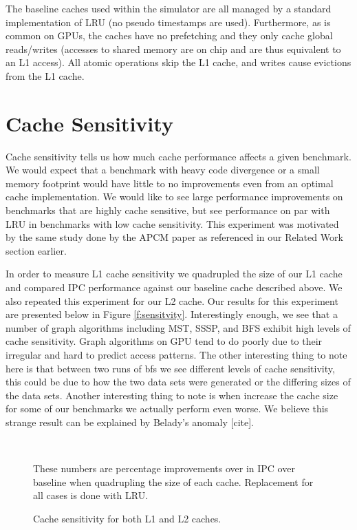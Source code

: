 The baseline caches used within the simulator are all managed by a standard implementation of LRU (no pseudo timestamps are used). Furthermore, as is common on GPUs, the caches have no prefetching and they only cache global reads/writes (accesses to shared memory are on chip and are thus equivalent to an L1 access). All atomic operations skip the L1 cache, and writes cause evictions from the L1 cache.

\section{Cache Sensitivity}
Cache sensitivity tells us how much cache performance affects a given benchmark. We would expect that a benchmark with heavy code divergence or a small memory footprint would have little to no improvements even from an optimal cache implementation. We would like to see large performance improvements on benchmarks that are highly cache sensitive, but see performance on par with LRU in benchmarks with low cache sensitivity. This experiment was motivated by the same study done by the APCM paper as referenced in our Related Work section earlier.

In order to measure L1 cache sensitivity we quadrupled the size of our L1 cache and compared IPC performance against our baseline cache described above. We also repeated this experiment for our L2 cache. Our results for this experiment are presented below in Figure \ref{f:sensitvity}. Interestingly enough, we see that a number of graph algorithms including MST, SSSP, and BFS exhibit high levels of cache sensitivity. Graph algorithms on GPU tend to do poorly due to their irregular and hard to predict access patterns. The other interesting thing to note here is that between two runs of bfs we see different levels of cache sensitivity, this could be due to how the two data sets were generated or the differing sizes of the data sets. Another interesting thing to note is when increase the cache size for some of our benchmarks we actually perform even worse. We believe this strange result can be explained by Belady’s anomaly [cite].

\begin{figure}[htb]
\begin{center}
\ 
\caption{Cache sensitivity for both L1 and L2 caches.} These numbers are percentage improvements over in IPC over baseline when quadrupling the size of each cache. Replacement for all cases is done with LRU.
\label{f:sensitivity}
\end{center}
\end{figure}
%

